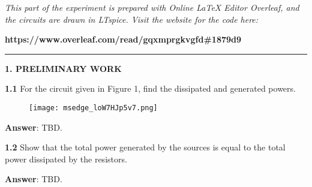 \documentclass{article}
\begin{document}
\large

{\textit{This part of the experiment is prepared with Online LaTeX Editor Overleaf, and the circuits are drawn in LTspice. Visit the website for the code here:}}

{\textbf{https://www.overleaf.com/read/gqxmprgkvgfd\#1879d9}}
\vspace{4mm}
\hrule
\vspace{4mm}
{\Large \textbf{1. PRELIMINARY WORK}}

\vspace{4mm}

{\textbf{1.1} For the circuit given in Figure 1, find the dissipated and generated powers.}

\vspace{4mm}

\begin{figure}[H]
    \centering
    \texttt{[image: msedge\_loW7HJp5v7.png]}
\end{figure}

{\textbf{Answer}: TBD.}

\vspace{8mm}

{\textbf{1.2} Show that the total power generated by the sources is equal to the total power 
dissipated by the resistors.}

\vspace{4mm}

{\textbf{Answer}: TBD.}

\vspace{8mm}


\end{document}
